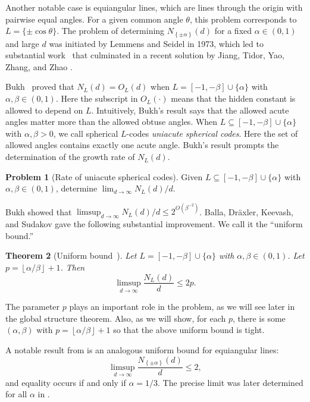 \documentclass[reqno, 11pt]{amsart}
\newtheorem{theorem}{Theorem}[section]
\theoremstyle{definition}
\newtheorem{problem}[theorem]{Problem}
\theoremstyle{remark}
\newcommand{\floor}[1]{\left\lfloor #1 \right\rfloor}
\newcommand{\set}[1]{\left\{ #1 \right\}}
\begin{document}
Another notable case is equiangular lines, which are lines through the origin with pairwise equal angles. For a given common angle $\theta$, this problem corresponds to $L = \{\pm \cos \theta\}$. The problem of determining $N_{\set{\pm \alpha}}(d)$ for a fixed $\alpha \in (0,1)$ and large $d$ was initiated by Lemmens and Seidel \cite{LS73} in 1973, which led to substantial work~\cite{Neu89,Buk16,BDKS18,JP20} that culminated in a recent solution by Jiang, Tidor, Yao, Zhang, and Zhao \cite{JTYZZ21}. 

Bukh~\cite{Buk16} proved that $N_L(d) = O_L(d)$ when $L = [-1, -\beta] \cup \{\alpha\}$ with $\alpha, \beta \in (0,1)$. Here the subscript in $O_L(\cdot)$ means that the hidden constant is allowed to depend on $L$.
Intuitively, Bukh's result says that the allowed acute angles matter more than the allowed obtuse angles.
When $L \subseteq [-1, -\beta] \cup \{\alpha\}$ with $\alpha,\beta >0$, we call spherical $L$-codes \emph{uniacute spherical codes}. Here the set of allowed angles contains exactly one acute angle.
Bukh's result prompts the determination of the growth rate of $N_L(d)$.

\begin{problem}[Rate of uniacute spherical codes] \label{prob:rate}
Given $L \subseteq [-1, -\beta] \cup \{\alpha\}$ with $\alpha, \beta \in (0,1)$, determine
$\lim_{d\to\infty} N_L(d)/d$.
\end{problem}

Bukh showed that $\limsup_{d\to\infty} N_L(d)/d \le 2^{O(\beta^{-2})}$.
Balla, Dr\"{a}xler,  Keevash, and Sudakov \cite{BDKS18} gave the following substantial improvement.
We call it the ``uniform bound.''

\begin{theorem}[Uniform bound~\cite{BDKS18}] \label{thm:uniform-lim}
Let $L = [-1, -\beta] \cup \{\alpha\}$ with $\alpha,\beta \in (0,1)$. Let
$p = \floor{\alpha/\beta} + 1$.
Then 
\[
\limsup_{d \to \infty} \frac{N_L(d)}{d} \le 2p.
\]
\end{theorem}

The parameter $p$ plays an important role in the problem, as we will see later in the global structure theorem. Also, as we will show, for each $p$, there is some $(\alpha,\beta)$ with $p = \floor{\alpha/\beta} + 1$ so that the above uniform bound is tight. 

A notable result from \cite{BDKS18} is an analogous uniform bound for equiangular lines:
\[
\limsup_{d \to \infty} \frac{N_{\set{\pm\alpha}}(d)}{d} \le 2,
\]
and equality occurs if and only if $\alpha = 1/3$.
The precise limit was later determined for all $\alpha$ in \cite{JTYZZ21}.
\end{document}
